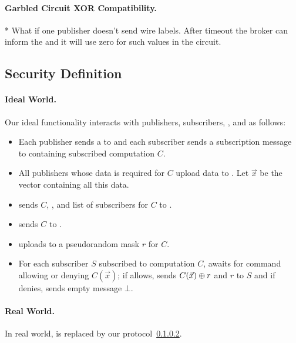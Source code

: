 \paragraph{Garbled Circuit XOR Compatibility.}


* What if one publisher doesn't send wire labels. After timeout the broker can
inform the \garbler and it will use zero for such values in the circuit.

\subsection{Security Definition}

\paragraph{Ideal World.}
Our ideal functionality \F interacts with publishers, subscribers, \broker, and
\garbler as follows:

\begin{itemize}[leftmargin=*]
		\item Each publisher sends a \policy to \F and each subscriber sends a
			subscription message to \F containing subscribed computation $C$.
		
		\item All publishers whose data is required for $C$ upload data to \F. Let
			$\vec{x}$ be the vector containing all this data.

		\item \F sends $C$, \policy, and list of subscribers for $C$ to \broker.

		\item \F sends $C$ to \garbler.

		\item \garbler uploads to \F a pseudorandom mask $r$ for $C$.

		\item For each subscriber $S$ subscribed to computation $C$, \F awaits for
			\broker command allowing or denying $C(\vec{x})$; if \broker allows, \F
			sends $C(\vec{x}) \oplus r$ and $r$ to $S$ and if \broker denies, \F sends
			empty message $\bot$.

\end{itemize}

\paragraph{Real World.} In real world, \F is replaced by our protocol~\ref{}.

